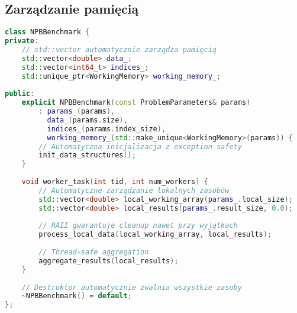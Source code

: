   
\subsection{Zarządzanie pamięcią}
\begin{lstlisting}[language=C++, caption={Implementacja nowoczesnego C++ - zarządzanie pamięcią}, label={lst:modern-cpp-memory}]
class NPBBenchmark {
private:
    // std::vector automatycznie zarządza pamięcią
    std::vector<double> data_;
    std::vector<int64_t> indices_;
    std::unique_ptr<WorkingMemory> working_memory_;
    
public:
    explicit NPBBenchmark(const ProblemParameters& params) 
        : params_(params),
          data_(params.size),
          indices_(params.index_size),
          working_memory_(std::make_unique<WorkingMemory>(params)) {
        // Automatyczna inicjalizacja z exception safety
        init_data_structures();
    }
    
    void worker_task(int tid, int num_workers) {
        // Automatyczne zarządzanie lokalnych zasobów
        std::vector<double> local_working_array(params_.local_size);
        std::vector<double> local_results(params_.result_size, 0.0);
        
        // RAII gwarantuje cleanup nawet przy wyjątkach
        process_local_data(local_working_array, local_results);
        
        // Thread-safe aggregation
        aggregate_results(local_results);
    }
    
    // Destruktor automatycznie zwalnia wszystkie zasoby
    ~NPBBenchmark() = default;
};
\end{lstlisting}

